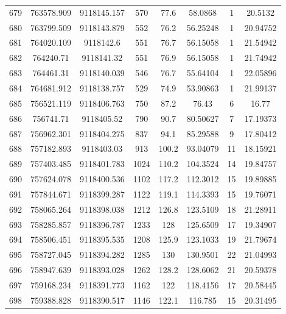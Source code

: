 \begin{longtable}{cccccccc}
679  & 763578.909      & 9118145.157      & 570     & 77.6  & 58.0868  & 1  & 20.5132  \\
680  & 763799.509      & 9118143.879      & 552     & 76.2  & 56.25248 & 1  & 20.94752 \\
681  & 764020.109      & 9118142.6        & 551     & 76.7  & 56.15058 & 1  & 21.54942 \\
682  & 764240.71       & 9118141.32       & 551     & 76.9  & 56.15058 & 1  & 21.74942 \\
683  & 764461.31       & 9118140.039      & 546     & 76.7  & 55.64104 & 1  & 22.05896 \\
684  & 764681.912      & 9118138.757      & 529     & 74.9  & 53.90863 & 1  & 21.99137 \\
685  & 756521.119      & 9118406.763      & 750     & 87.2  & 76.43    & 6  & 16.77    \\
686  & 756741.71       & 9118405.52       & 790     & 90.7  & 80.50627 & 7  & 17.19373 \\
687  & 756962.301      & 9118404.275      & 837     & 94.1  & 85.29588 & 9  & 17.80412 \\
688  & 757182.893      & 9118403.03       & 913     & 100.2 & 93.04079 & 11 & 18.15921 \\
689  & 757403.485      & 9118401.783      & 1024    & 110.2 & 104.3524 & 14 & 19.84757 \\
690  & 757624.078      & 9118400.536      & 1102    & 117.2 & 112.3012 & 15 & 19.89885 \\
691  & 757844.671      & 9118399.287      & 1122    & 119.1 & 114.3393 & 15 & 19.76071 \\
692  & 758065.264      & 9118398.038      & 1212    & 126.8 & 123.5109 & 18 & 21.28911 \\
693  & 758285.857      & 9118396.787      & 1233    & 128   & 125.6509 & 17 & 19.34907 \\
694  & 758506.451      & 9118395.535      & 1208    & 125.9 & 123.1033 & 19 & 21.79674 \\
695  & 758727.045      & 9118394.282      & 1285    & 130   & 130.9501 & 22 & 21.04993 \\
696  & 758947.639      & 9118393.028      & 1262    & 128.2 & 128.6062 & 21 & 20.59378 \\
697  & 759168.234      & 9118391.773      & 1162    & 122   & 118.4156 & 17 & 20.58445 \\
698  & 759388.828      & 9118390.517      & 1146    & 122.1 & 116.785  & 15 & 20.31495 \\

\end{longtable}
